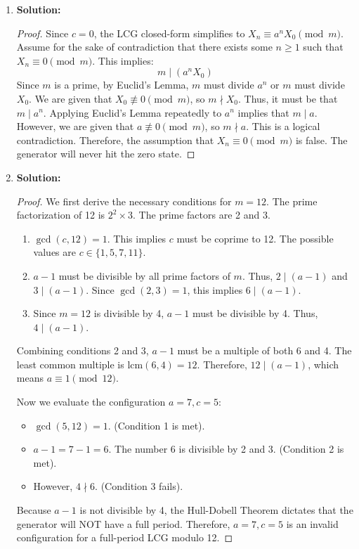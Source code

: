\documentclass{article}
\begin{document}
\begin{enumerate}
    \item \textbf{Solution:}
    \begin{proof}
        Since $c=0$, the LCG closed-form simplifies to $X_n \equiv a^n X_0 \pmod m$. Assume for the sake of contradiction that there exists some $n \ge 1$ such that $X_n \equiv 0 \pmod m$. This implies:
        \[ m \mid (a^n X_0) \]
        Since $m$ is a prime, by Euclid's Lemma, $m$ must divide $a^n$ or $m$ must divide $X_0$. We are given that $X_0 \not\equiv 0 \pmod m$, so $m \nmid X_0$. Thus, it must be that $m \mid a^n$. Applying Euclid's Lemma repeatedly to $a^n$ implies that $m \mid a$. However, we are given that $a \not\equiv 0 \pmod m$, so $m \nmid a$. This is a logical contradiction. Therefore, the assumption that $X_n \equiv 0 \pmod m$ is false. The generator will never hit the zero state.
    \end{proof}

    \item \textbf{Solution:}
    \begin{proof}
        We first derive the necessary conditions for $m=12$. The prime factorization of 12 is $2^2 \times 3$. The prime factors are 2 and 3.
        \begin{enumerate}
            \item $\gcd(c, 12) = 1$. This implies $c$ must be coprime to 12. The possible values are $c \in \{1, 5, 7, 11\}$.
            \item $a-1$ must be divisible by all prime factors of $m$. Thus, $2 \mid (a-1)$ and $3 \mid (a-1)$. Since $\gcd(2,3)=1$, this implies $6 \mid (a-1)$.
            \item Since $m=12$ is divisible by 4, $a-1$ must be divisible by 4. Thus, $4 \mid (a-1)$.
        \end{enumerate}
        Combining conditions 2 and 3, $a-1$ must be a multiple of both 6 and 4. The least common multiple is $\text{lcm}(6, 4) = 12$. Therefore, $12 \mid (a-1)$, which means $a \equiv 1 \pmod{12}$.
        
        Now we evaluate the configuration $a=7, c=5$:
        \begin{itemize}
            \item $\gcd(5, 12) = 1$. (Condition 1 is met).
            \item $a-1 = 7-1 = 6$. The number 6 is divisible by 2 and 3. (Condition 2 is met).
            \item However, $4 \nmid 6$. (Condition 3 fails).
        \end{itemize}
        Because $a-1$ is not divisible by 4, the Hull-Dobell Theorem dictates that the generator will NOT have a full period. Therefore, $a=7, c=5$ is an invalid configuration for a full-period LCG modulo 12.
    \end{proof}

\end{enumerate}
\end{document}
